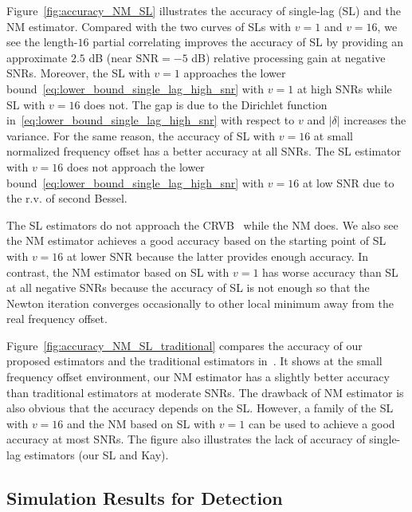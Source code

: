 Figure~\ref{fig:accuracy_NM_SL} illustrates the accuracy of single-lag (SL) and the NM estimator.
Compared with the two curves of SLs with $v{=}1$ and $v{=}16$, we see the length-$16$ partial correlating
improves the accuracy of SL by providing an approximate $2.5$ dB (near $\text{SNR}{=}{-}5$ dB) relative processing gain at negative SNRs.
Moreover, the SL with $v{=}1$ approaches the lower bound~\eqref{eq:lower_bound_single_lag_high_snr} with $v=1$ at high SNRs
while SL with $v{=}16$ does not. The gap is due to the Dirichlet function in~\eqref{eq:lower_bound_single_lag_high_snr} with respect to $v$ and $|\delta|$
increases the variance. For the same reason, the accuracy of SL with $v{=}16$ at small normalized frequency offset
has a better accuracy at all SNRs. The SL estimator with $v=16$ does not approach the lower bound~\eqref{eq:lower_bound_single_lag_high_snr} with $v=16$
at low SNR due to the r.v. of second Bessel. 

The SL estimators do not approach the CRVB~\cite{Gini_98} while the NM does. We also see the NM estimator achieves
a good accuracy based on the starting point of SL with $v{=}16$ at lower SNR because the latter provides
enough accuracy. In contrast, the NM estimator based on SL with $v{=}1$ has worse accuracy than SL 
at all negative SNRs because the accuracy of SL is not enough so that the Newton iteration converges occasionally to 
other local minimum away from the real frequency offset.

Figure~\ref{fig:accuracy_NM_SL_traditional} compares the accuracy of our proposed estimators
and the traditional estimators in~\cite{kay_89,Fitz_94,Luise_Reggiannini_95}. It shows at the small frequency offset environment,
our NM estimator has a slightly better accuracy than traditional estimators at moderate SNRs.
The drawback of NM estimator is also obvious that the accuracy depends on the SL.
However, a family of the SL with $v=16$ and the NM based on SL with $v=1$ can be used
to achieve a good accuracy at most SNRs. 
The figure also illustrates the lack of accuracy of single-lag estimators (our SL and Kay).

\subsection{Simulation Results for Detection}


